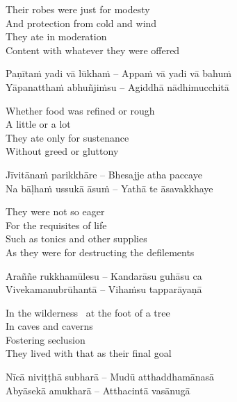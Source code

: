 \begin{english-verses}
  Their robes were just for modesty\\
  And protection from cold and wind\\
  They ate in moderation\\
  Content with whatever they were offered
\end{english-verses}

\begin{verses}
  Paṇītaṁ yadi vā lūkhaṁ – Appaṁ vā yadi vā bahuṁ\\
  Yāpanatthaṁ abhuñjiṁsu – Agiddhā nādhimucchitā
\end{verses}

\begin{english-verses}
  Whether food was refined or rough\\
  A little or a lot\\
  They ate only for sustenance\\
  Without greed or gluttony
\end{english-verses}

\begin{verses}
  Jīvitānaṁ parikkhāre – Bhesajje atha paccaye\\
  Na bāḷhaṁ ussukā āsuṁ – Yathā te āsavakkhaye
\end{verses}

\begin{english-verses}
  They were not so eager\\
  For the requisites of life\\
  Such as tonics and other supplies\\
  As they were for destructing the defilements
\end{english-verses}

\begin{verses}
  Araññe rukkhamūlesu – Kandarāsu guhāsu ca\\
  Vivekamanubrūhantā – Vihaṁsu tapparāyaṇā
\end{verses}

\begin{english-verses}
  In the wilderness \breathmark\ at the foot of a tree\\
  In caves and caverns\\
  Fostering seclusion\\
  They lived with that as their final goal
\end{english-verses}

\begin{verses}
  Nīcā niviṭṭhā subharā – Mudū atthaddhamānasā\\
  Abyāsekā amukharā – Atthacintā vasānugā
\end{verses}

